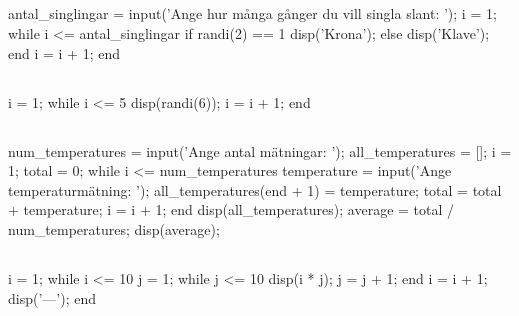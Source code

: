 \subsection*{}
\vspace{3pt}
\begin{matlab}
antal_singlingar = input('Ange hur många gånger du vill singla slant: ');
i = 1;
while i <= antal_singlingar
	if randi(2) == 1
		disp('Krona');
	else
		disp('Klave');
	end
	i = i + 1;
end
\end{matlab}

\subsection*{}
\vspace{3pt}
\begin{matlab}
i = 1;
while i <= 5
	disp(randi(6));
	i = i + 1;
end
\end{matlab}
\newpage
\subsection*{}
\vspace{3pt}
\begin{matlab}
num_temperatures = input('Ange antal mätningar: ');
all_temperatures = [];
i = 1; %
total = 0; %
while i <= num_temperatures
	temperature = input('Ange temperaturmätning: ');
	all_temperatures(end + 1) = temperature;
	total = total + temperature;
	i = i + 1;
end
disp(all_temperatures);
average = total / num_temperatures;
disp(average);
\end{matlab}

\subsection*{}
\vspace{3pt}
\begin{matlab}
i = 1; %
while i <= 10
	j = 1; %
	while j <= 10
		disp(i * j);
		j = j + 1;
	end
	i = i + 1;
	disp('---'); %
end
\end{matlab}


